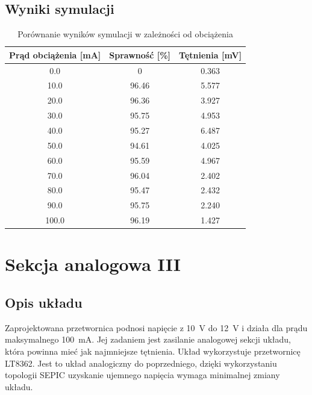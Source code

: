 \documentclass{article}
\begin{document}
\subsection{Wyniki symulacji}
\begin{table}[H]
    \centering
    \caption{Porównanie wyników symulacji w zależności od obciążenia}
    \label{tab:efficiency_ripple}
    \begin{tabular}{ccc}
        \toprule
        \textbf{Prąd obciążenia [mA]} & \textbf{Sprawność [\%]} & \textbf{Tętnienia [mV]} \\
        \midrule
        0.0                           & 0                       & 0.363                   \\
        10.0                          & 96.46                   & 5.577                   \\
        20.0                          & 96.36                   & 3.927                   \\
        30.0                          & 95.75                   & 4.953                   \\
        40.0                          & 95.27                   & 6.487                   \\
        50.0                          & 94.61                   & 4.025                   \\
        60.0                          & 95.59                   & 4.967                   \\
        70.0                          & 96.04                   & 2.402                   \\
        80.0                          & 95.47                   & 2.432                   \\
        90.0                          & 95.75                   & 2.240                   \\
        100.0                         & 96.19                   & 1.427                   \\
        \bottomrule
    \end{tabular}
\end{table}


\section{Sekcja analogowa III}
\subsection{Opis układu}
Zaprojektowana przetwornica podnosi napięcie z \SI{10}{\V} do \SI{12}{\V} i działa dla prądu maksymalnego \SI{100}{\milli\A}. Jej zadaniem jest zasilanie analogowej sekcji układu, która powinna mieć jak najmniejsze tętnienia. Układ wykorzystuje przetwornicę LT8362. Jest to układ analogiczny do poprzedniego, dzięki wykorzystaniu topologii SEPIC uzyskanie ujemnego napięcia wymaga minimalnej zmiany układu.
\end{document}
